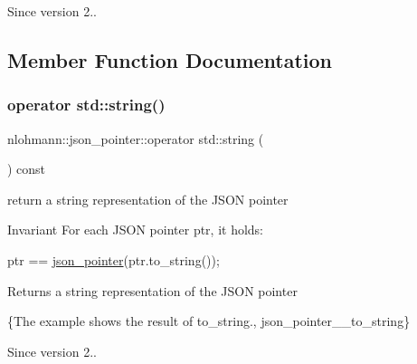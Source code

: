 \begin{DoxySince}{Since}
version 2.. 
\end{DoxySince}


\subsection{Member Function Documentation}
\mbox{\label{classnlohmann_1_1json__pointer_a7c2d84318102529336beab1b5952bba0}} 
\subsubsection{\texorpdfstring{operator std\+::string()}{operator std::string()}}
{\footnotesize\ttfamily nlohmann\+::json\+\_\+pointer\+::operator std\+::string (\begin{DoxyParamCaption}{ }\end{DoxyParamCaption}) const\hspace{0.3cm}{\ttfamily [inline]}}



return a string representation of the J\+S\+ON pointer 

\begin{DoxyInvariant}{Invariant}
For each J\+S\+ON pointer {\ttfamily ptr}, it holds\+: 
\begin{DoxyCode}
ptr == \hyperlink{classnlohmann_1_1json__pointer_a203910314c0be11c6b2b2cb53a9ad3aa}{json\_pointer}(ptr.to\_string());
\end{DoxyCode}

\end{DoxyInvariant}
\begin{DoxyReturn}{Returns}
a string representation of the J\+S\+ON pointer
\end{DoxyReturn}
\{The example shows the result of {\ttfamily to\+\_\+string}., json\+\_\+pointer\+\_\+\+\_\+to\+\_\+string\}

\begin{DoxySince}{Since}
version 2.. 
\end{DoxySince}
\mbox{\label{classnlohmann_1_1json__pointer_a0920ebb015398813880e3c0f8464526e}} 
